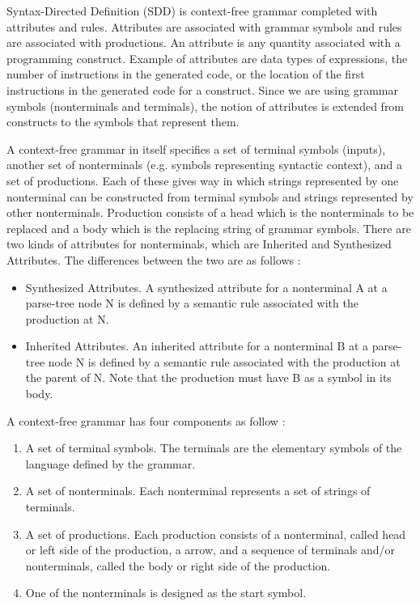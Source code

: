 Syntax-Directed Definition (SDD) is context-free grammar completed with attributes and rules. Attributes are associated with grammar symbols and rules are associated with productions. An attribute is any quantity associated with a programming construct. Example of attributes are data types of expressions, the number of instructions in the generated code, or the location of the first instructions in the generated code for a construct. Since we are using grammar symbols (nonterminals and terminals), the notion of attributes is extended from constructs to the symbols that represent them.

A context-free grammar in itself specifies a set of terminal symbols (inputs), another set of nonterminals (e.g. symbols representing syntactic context), and a set of productions. Each of these gives way in which strings represented by one nonterminal can be constructed from terminal symbols and strings represented by other nonterminals. Production consists of a head which is the nonterminals to be replaced and a body which is the replacing string of grammar symbols. There are two kinds of attributes for nonterminals, which are Inherited and Synthesized Attributes. The differences between the two are as follows \cite{lam2006compilers}:
\begin{itemize}
\item Synthesized Attributes. A synthesized attribute for a nonterminal A at a parse-tree node N is defined by a semantic rule associated with the production at N.
\item Inherited Attributes. An inherited attribute for a nonterminal B at a parse-tree node N is defined by a semantic rule associated with the production at the parent of N. Note that the production must have B as a symbol in its body.
\end{itemize}

\begin{definition}
A context-free grammar has four components as follow \cite{lam2006compilers}:
\begin{enumerate}
\item A set of terminal symbols. The terminals are the elementary symbols of the language defined by the grammar. 
\item A set of nonterminals. Each nonterminal represents a set of strings of terminals. 
\item A set of productions. Each production consists of a nonterminal, called head or left side of the production, a arrow, and a sequence of terminals and/or nonterminals, called the body or right side of the production. 
\item One of the nonterminals is designed as the start symbol. 
\end{enumerate}
\label{def:grammar}
\end{definition}

